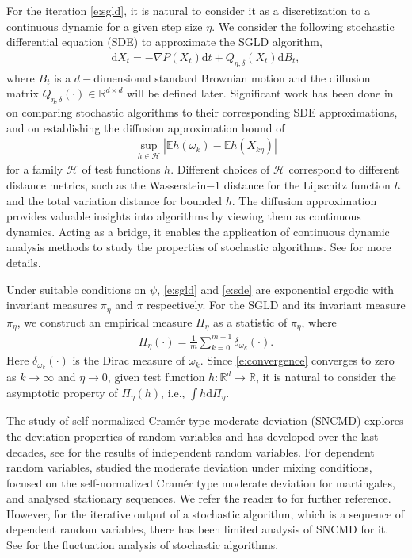 \documentclass[12pt]{amsart}
\theoremstyle{definition}
\theoremstyle{remark}
\numberwithin{equation}{section}
\newcommand{\dif}{\mathrm{d}}
\newcommand{\E}{\mathbb{E}}            %
\newcommand{\R}{\mathbb{R}}\newcommand{\RR}{\mathbb{R}}
\begin{document}
For the iteration \eqref{e:sgld}, it is natural to consider it as a discretization to a continuous dynamic for a given step size $\eta$. We consider the following stochastic differential equation (SDE) to approximate the SGLD algorithm,
\begin{eqnarray}\label{e:sde}
	\dif X_t=-\nabla P(X_t)\dif t+Q_{\eta,\delta}(X_t)\dif B_t,
\end{eqnarray}
where $B_t$ is a $d-$dimensional standard Brownian motion and the diffusion matrix $Q_{\eta,\delta}(\cdot)\in\R^{d\times d}$ will be defined later. Significant work has been done in \cite{feng2019uniform, hu2019diffusion} on comparing stochastic algorithms to their  corresponding SDE approximations, and on establishing the diffusion approximation bound of 
\begin{eqnarray}\label{e:convergence}
	\sup_{h\in\mathcal H}|\E h(\omega_k)-\E h(X_{k\eta})|
\end{eqnarray}
for a family $\mathcal H$ of test functions $h$. Different choices of  $\mathcal{H}$ correspond to different distance metrics, such as the Wasserstein$-1$ distance for the Lipschitz function $h$ and the total variation distance for bounded $h$. The diffusion approximation provides valuable insights into algorithms by viewing them as continuous dynamics. Acting as a bridge, it enables the application of continuous dynamic analysis methods to study the properties of stochastic algorithms. See \cite{li2017stochastic, li2019stochastic, chen2022approximation}  for more details.

Under suitable conditions on $\psi$, \eqref{e:sgld} and \eqref{e:sde} are exponential ergodic with invariant measures $\pi_\eta$ and $\pi$ respectively. For the SGLD and its invariant measure $\pi_\eta$, we construct an empirical measure
$\Pi_\eta$ as a statistic of $\pi_\eta$, where
\begin{eqnarray*}
	\Pi_\eta(\cdot)=\frac{1}{m}\sum_{k=0}^{m-1}\delta_{\omega_k}(\cdot).
\end{eqnarray*}
Here $\delta_{\omega_k}(\cdot)$ is the Dirac measure of $\omega_k$. Since \eqref{e:convergence} converges to zero as $k\to\infty$ and $\eta\to0$, given test function $h:\R^d \rightarrow \R$, it is natural to consider the asymptotic property of $\Pi_\eta(h)$, i.e.,  $\int h\dif \Pi_\eta$.

The study of self-normalized Cram\'er type moderate deviation (SNCMD) explores the deviation properties of random variables and has developed over the last decades, see \cite{shao1999cramer, JSW03} for the results of independent random variables. For dependent random variables, \cite{CSWX16} studied the moderate deviation under mixing conditions, \cite{Fan2019self} focused on the self-normalized Cram\'er type moderate deviation for martingales, and \cite{Fan2020} analysed stationary sequences. We refer the reader to \cite{jiang2022deviation, shao2016cramer, zhang2023cramer} for further reference.  However, for the iterative output of a stochastic algorithm, which is a sequence of dependent random variables, there has been limited analysis of SNCMD for it. See  \cite{Teh2016, gao2023moderate} for the fluctuation analysis of stochastic algorithms. 
\end{document}
